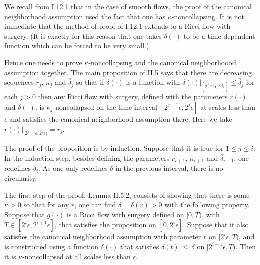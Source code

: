 We recall from I.12.1 that
in the case of smooth flows, the proof of the canonical neighborhood assumption
used the fact that one has $\kappa$-noncollapsing. It is not immediate that the
method of proof of I.12.1 extends to a Ricci flow with surgery.
(It is exactly for this reason that one takes $\delta(\cdot)$ to be a
time-dependent function which can be forced to be very small.)

Hence one needs to prove $\kappa$-noncollapsing and
the canonical neighborhoood assumption together. The main proposition of
II.5 says that there are decreasing sequences $r_j$, $\kappa_j$ and
$\overline{\delta}_j$ so that if $\delta(\cdot)$ is a function with
$\delta(\cdot) \big|_{[2^{j-1} \epsilon, 2^j \epsilon]} \le \overline{\delta}_j$
for each $j > 0$ then any Ricci flow with surgery, defined with the
parameters $r(\cdot)$ and $\delta(\cdot)$, is $\kappa_j$-noncollapsed on
the time interval $[2^{j-1} \epsilon, 2^j \epsilon]$ at scales less than
$\epsilon$ and satisfies the
canonical neighborhood assumption there. Here we take
$r(\cdot) \big|_{[2^{j-1} \epsilon, 2^j \epsilon)} = r_j$.

The proof of the proposition is by induction.  Suppose that it is true for
$1 \le j \le i$. In the induction step,
besides defining the parameters $r_{i+1}$, $\kappa_{i+1}$ and
$\overline{\delta}_{i+1}$, one redefines $\overline{\delta}_i$. As one
only redefines $\overline{\delta}$ in the previous interval, there is no
circularity.

The first step of the proof, Lemma II.5.2, consists of showing
that there is some $\kappa > 0$ so that for any $r$, one can
find $\overline{\delta} = \overline{\delta}(r) > 0$ with the following
property. Suppose that $g(\cdot)$ is a Ricci flow
with surgery defined on $[0, T)$, with $T \in [2^i \epsilon, 2^{i+1} \epsilon]$,
that satisfies the proposition on $[0, 2^i \epsilon]$.
Suppose that it also satisfies the canonical neighborhood assumption with
parameter $r$ on $[2^i \epsilon, T)$, and is constructed using a function
$\delta(\cdot)$ that satisfies $\delta(t) \: \le \: \overline{\delta}$ on
$[2^{i-1} \epsilon, T)$. Then it is
$\kappa$-noncollapsed at all scales less than $\epsilon$.

